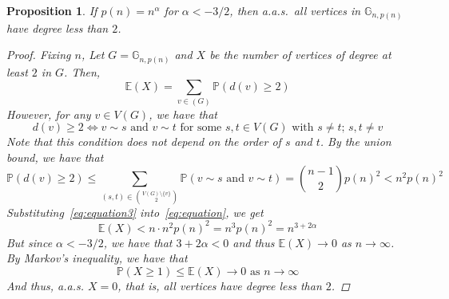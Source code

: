 \documentclass{amsart}
\theoremstyle{plain}
\newtheorem*{proposition}{\textbf{Proposition}}
\theoremstyle{definition}
\begin{document}
    \begin{proposition}
        If $p(n) = n^{\alpha}$ for $\alpha < -3/2$, then a.a.s.\
        all vertices in $\mathbb{G}_{n, p(n)}$ have degree less than $2$.

        \begin{proof}
            \vspace{-3mm}
            Fixing $n$, Let $G = \mathbb{G}_{n, p(n)}$ and $X$
            be the number of vertices of degree at least $2$ in $G$.
            Then,
            \begin{equation}
                \mathbb{E}(X) = \sum_{v\in(G)} \mathbb{P}(d(v) \geq 2)\label{eq:equation}
            \end{equation}
            However, for any $v \in V(G)$, we have that
            \begin{equation}
                d(v) \geq 2 \iff v \sim s \text{ and } v \sim t \text{ for some }
                s, t \in V(G) \text{ with } s \neq t; \, s, t \neq v
                \label{eq:equation2}
            \end{equation}
            Note that this condition does not depend on the order of $s$ and $t$.
            By the union bound, we have that
            \begin{equation}
                \mathbb{P}(d(v) \geq 2) \leq
                \sum_{(s, t) \in \binom{V(G) \setminus \{v\}}{2}} \mathbb{P}(v \sim s \text{ and } v \sim t) =
                \binom{n-1}{2} p(n)^2 < n^2 p(n)^2
                \label{eq:equation3}
            \end{equation}
            Substituting~\eqref{eq:equation3} into~\eqref{eq:equation}, we get
            \begin{equation}
                \mathbb{E}(X) < n \cdot n^2 p(n)^2 = n^3 p(n)^2 = n^{3 + 2\alpha}
                \label{eq:equation4}
            \end{equation}
            But since $\alpha < -3/2$, we have that $3 + 2\alpha < 0$ and thus $\mathbb{E}(X) \to 0$ as $n \to \infty$.
            By Markov's inequality, we have that
            \begin{equation}
                \mathbb{P}(X \geq 1) \leq \mathbb{E}(X) \to 0 \text{ as } n \to \infty
                \label{eq:equation5}
            \end{equation}
            And thus, a.a.s. $X = 0$, that is, all vertices have degree less than $2$.
        \end{proof}
    \end{proposition}
\end{document}
